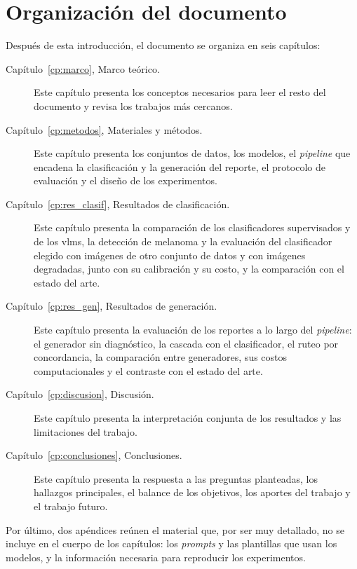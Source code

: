 \section{Organización del documento}
\label{sec:intro_organizacion}
Después de esta introducción, el documento se organiza en seis capítulos:

\begin{description}
  \item[Capítulo~\ref{cp:marco}, Marco teórico.] Este capítulo presenta los conceptos necesarios para leer el
  resto del documento y revisa los trabajos más cercanos.
  \item[Capítulo~\ref{cp:metodos}, Materiales y métodos.] Este capítulo presenta los conjuntos de datos, los
  modelos, el \emph{pipeline} que encadena la clasificación y la generación del reporte, el protocolo de
  evaluación y el diseño de los experimentos.
  \item[Capítulo~\ref{cp:res_clasif}, Resultados de clasificación.] Este capítulo presenta la comparación de los
  clasificadores supervisados y de los \glspl{vlm}, la detección de melanoma y la evaluación del clasificador elegido
  con imágenes de otro conjunto de datos y con imágenes degradadas, junto con su calibración y su costo, y la comparación con el estado del arte.
  \item[Capítulo~\ref{cp:res_gen}, Resultados de generación.] Este capítulo presenta la evaluación de los reportes
  a lo largo del \emph{pipeline}: el generador sin diagnóstico, la cascada con el clasificador, el ruteo por
  concordancia, la comparación entre generadores, sus costos computacionales y el contraste con el estado del arte.
  \item[Capítulo~\ref{cp:discusion}, Discusión.] Este capítulo presenta la interpretación conjunta de los
  resultados y las limitaciones del trabajo.
  \item[Capítulo~\ref{cp:conclusiones}, Conclusiones.] Este capítulo presenta la respuesta a las preguntas
  planteadas, los hallazgos principales, el
  balance de los objetivos, los aportes del trabajo y el trabajo futuro.
\end{description}

Por último, dos apéndices reúnen el material que, por ser muy detallado, no se incluye en el cuerpo de los
capítulos: los \emph{prompts} y las plantillas que usan los modelos, y la información necesaria para reproducir los
experimentos.

